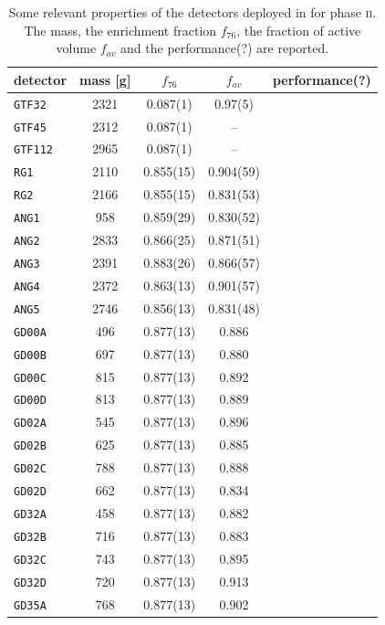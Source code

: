 \begin{table}
	\begin{center}
	\caption{Some relevant properties of the detectors deployed in {\gerda} for phase \textsc{ii}. The mass, the enrichment fraction $f_{76}$, the fraction of active volume $f_{av}$ and the performance(?) are reported.}
	\begin{tabular}{lcccc}
		\toprule
		detector		&	mass [g]	&	$f_{76}$	&	$f_{av}$	&	performance(?) \\
		\midrule
		\texttt{GTF32}	&	2321	&	0.087(1)	&	0.97(5)		&		\\
		\texttt{GTF45}	&	2312	&	0.087(1)	&	--			&		\\
		\texttt{GTF112}	&	2965	&	0.087(1)	&	--			&		\\
		\texttt{RG1}	&	2110	&	0.855(15)	&	0.904(59)	&		\\
		\texttt{RG2}	&	2166	&	0.855(15)	&	0.831(53)	&		\\
		\texttt{ANG1}	&	958 	&	0.859(29)	&	0.830(52)	&		\\
		\texttt{ANG2}	&	2833	&	0.866(25)	&	0.871(51)	&		\\
		\texttt{ANG3}	&	2391	&	0.883(26)	&	0.866(57)	&		\\
		\texttt{ANG4}	&	2372	&	0.863(13)	&	0.901(57)	&		\\
		\texttt{ANG5}	&	2746	&	0.856(13)	&	0.831(48)	&		\\
		\texttt{GD00A}	&	496 	&	0.877(13)	&	0.886   	&		\\
		\texttt{GD00B}	&	697 	&	0.877(13)	&	0.880   	&		\\
		\texttt{GD00C}	&	815 	&	0.877(13)	&	0.892   	&		\\
		\texttt{GD00D}	&	813 	&	0.877(13)	&	0.889   	&		\\
		\texttt{GD02A}	&	545 	&	0.877(13)	&	0.896   	&		\\
		\texttt{GD02B}	&	625 	&	0.877(13)	&	0.885   	&		\\
		\texttt{GD02C}	&	788 	&	0.877(13)	&	0.888   	&		\\
		\texttt{GD02D}	&	662 	&	0.877(13)	&	0.834   	&		\\
		\texttt{GD32A}	&	458 	&	0.877(13)	&	0.882   	&		\\
		\texttt{GD32B}	&	716 	&	0.877(13)	&	0.883   	&		\\
		\texttt{GD32C}	&	743 	&	0.877(13)	&	0.895   	&		\\
		\texttt{GD32D}	&	720 	&	0.877(13)	&	0.913   	&		\\
		\texttt{GD35A}	&	768 	&	0.877(13)	&	0.902   	&		\\

\end{tabular}
\end{center}
\end{table}
